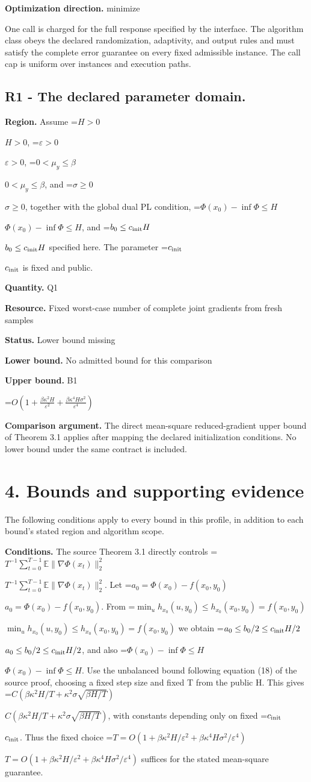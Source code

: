 \documentclass[10pt,a4paper]{article}
\newcommand{\AtlasMath}[1]{\par\begingroup\centering\setbox0=\hbox{$\displaystyle #1$}\ifdim\wd0>1.4\linewidth\typeout{ATLAS WIDE FORMULA: \the\wd0}\fi\ifdim\wd0>\linewidth\resizebox{\linewidth}{!}{\box0}\else\box0\fi\par\endgroup}
\newcommand{\AtlasInlineMath}[1]{\begingroup\setbox0=\hbox{$#1$}\ifdim\wd0>.4\linewidth\endgroup\AtlasMath{#1}\else\endgroup$#1$\fi}
\begin{document}
\textbf{Optimization direction.} minimize

One call is charged for the full response specified by the interface. The algorithm class obeys the declared randomization, adaptivity, and output rules and must satisfy the complete error guarantee on every fixed admissible instance. The call cap is uniform over instances and execution paths.

\subsection{R1 - The declared parameter domain.}
\textbf{Region.} Assume \AtlasInlineMath{H>0}, \AtlasInlineMath{\varepsilon>0}, \AtlasInlineMath{0<\mu_y\le\beta}, and \AtlasInlineMath{\sigma\ge0}, together with the global dual PL condition, \AtlasInlineMath{\Phi(x_0)-\inf\Phi\le H}, and \AtlasInlineMath{b_0\le c_{\rm init}H} specified here. The parameter \AtlasInlineMath{c_{\rm init}} is fixed and public.

\textbf{Quantity.} Q1

\textbf{Resource.} Fixed worst-case number of complete joint gradients from fresh samples

\textbf{Status.} Lower bound missing

\textbf{Lower bound.} No admitted bound for this comparison

\textbf{Upper bound.} B1

\AtlasMath{O\!\left(1+\frac{\beta\kappa^2 H}{\varepsilon^2}+\frac{\beta\kappa^4 H\sigma^2}{\varepsilon^4}\right)}
\textbf{Comparison argument.} The direct mean-square reduced-gradient upper bound of Theorem 3.1 applies after mapping the declared initialization conditions. No lower bound under the same contract is included.

\section{4. Bounds and supporting evidence}
The following conditions apply to every bound in this profile, in addition to each bound's stated region and algorithm scope.

\textbf{Conditions.} The source Theorem 3.1 directly controls \AtlasInlineMath{T^{-1}\sum_{t=0}^{T-1}\mathbb E\|\nabla\Phi(x_t)\|_2^2}. Let \AtlasInlineMath{a_0=\Phi(x_0)-f(x_0,y_0)}. From \AtlasInlineMath{\min_u h_{x_0}(u,y_0)\le h_{x_0}(x_0,y_0)=f(x_0,y_0)} we obtain \AtlasInlineMath{a_0\le b_0/2\le c_{\rm init}H/2}, and also \AtlasInlineMath{\Phi(x_0)-\inf\Phi\le H}. Use the unbalanced bound following equation (18) of the source proof, choosing a fixed step size and fixed T from the public H. This gives \AtlasInlineMath{C(\beta\kappa^2H/T+\kappa^2\sigma\sqrt{\beta H/T})}, with constants depending only on fixed \AtlasInlineMath{c_{\rm init}}. Thus the fixed choice \AtlasInlineMath{T=O(1+\beta\kappa^2H/\varepsilon^2+\beta\kappa^4H\sigma^2/\varepsilon^4)} suffices for the stated mean-square guarantee.
\end{document}
